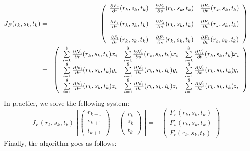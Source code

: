 \begin{eqnarray}
J_F(r_k,s_k,t_k)
&=&
\left(
\begin{array}{ccc}
\frac{\partial F_r}{\partial r}(r_k,s_k,t_k) & \frac{\partial F_r}{\partial s}(r_k,s_k,t_k) & \frac{\partial F_r}{\partial t}(r_k,s_k,t_k) \\\\
\frac{\partial F_s}{\partial r}(r_k,s_k,t_k) & \frac{\partial F_s}{\partial s}(r_k,s_k,t_k) & \frac{\partial F_s}{\partial t}(r_k,s_k,t_k) \\\\
\frac{\partial F_t}{\partial r}(r_k,s_k,t_k) & \frac{\partial F_t}{\partial s}(r_k,s_k,t_k) & \frac{\partial F_t}{\partial t}(r_k,s_k,t_k) 
\end{array}
\right) \nonumber\\
&=&
\left(
\begin{array}{ccc}
\sum\limits_{i=1}^8 \frac{\partial {\mathcal{N}}_i}{\partial r}(r_k,s_k,t_k) x_i &
\sum\limits_{i=1}^8 \frac{\partial {\mathcal{N}}_i}{\partial s}(r_k,s_k,t_k) x_i &
\sum\limits_{i=1}^8 \frac{\partial {\mathcal{N}}_i}{\partial t}(r_k,s_k,t_k) x_i \\
\sum\limits_{i=1}^8 \frac{\partial {\mathcal{N}}_i}{\partial r}(r_k,s_k,t_k) y_i &
\sum\limits_{i=1}^8 \frac{\partial {\mathcal{N}}_i}{\partial s}(r_k,s_k,t_k) y_i &
\sum\limits_{i=1}^8 \frac{\partial {\mathcal{N}}_i}{\partial t}(r_k,s_k,t_k) y_i \\
\sum\limits_{i=1}^8 \frac{\partial {\mathcal{N}}_i}{\partial r}(r_k,s_k,t_k) z_i &
\sum\limits_{i=1}^8 \frac{\partial {\mathcal{N}}_i}{\partial s}(r_k,s_k,t_k) z_i &
\sum\limits_{i=1}^8 \frac{\partial {\mathcal{N}}_i}{\partial t}(r_k,s_k,t_k) z_i 
\end{array}
\right) \nonumber 
\end{eqnarray}
In practice, we solve the following system:
\[
J_F(r_k,s_k,t_k) 
\left[  
\left(
\begin{array}{c}
r_{k+1} \\s_{k+1} \\ t_{k+1}
\end{array}
\right)
-
\left(
\begin{array}{c}
r_{k} \\s_{k} \\ t_{k}
\end{array}
\right)
\right]=-
\left(
\begin{array}{c}
F_r(r_k,s_k,t_k) \\
F_s(r_k,s_k,t_k)\\
F_t(r_k,s_k,t_k)
\end{array}
\right)
\]
Finally, the algorithm goes as follows:
